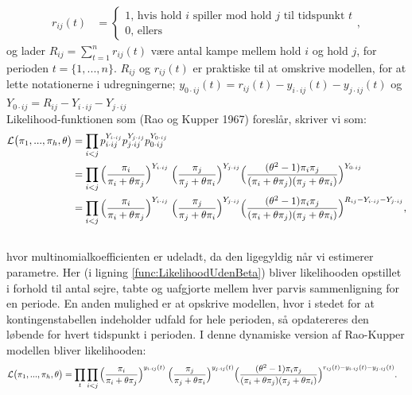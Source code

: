 \documentclass[11pt,a4paper]{article}
\begin{document}
\begin{align*}
r_{ij}(t)&=\begin{cases}
1\text{, hvis hold $i$ spiller mod hold $j$ til tidspunkt $t$}\\
0\text{, ellers}
\end{cases},
\end{align*}
og lader $R_{ij}=\sum_{t=1}^nr_{ij}(t)$ være antal kampe mellem hold $i$ og hold $j$, for perioden $t=\{1,...,n\}$. $R_{ij}$ og $r_{ij}(t)$ er praktiske til at omskrive modellen, for at lette notationerne i udregningerne; $y_{0\cdot ij}(t)=r_{ij}(t)-y_{i\cdot ij}(t)-y_{j\cdot ij}(t)$ og $Y_{0\cdot ij}=R_{ij}-Y_{i\cdot ij}-Y_{j\cdot ij}$\\
Likelihood-funktionen som (Rao og Kupper 1967) \cite{RaoKupper} foreslår, skriver vi som:
\begin{align}
\mathcal{L}\big{(}\pi_1,...,\pi_h,\theta\big{)} &= \prod_{i<j}p_{i\cdot ij}^{Y_{i\cdot ij}}p_{j\cdot ij}^{Y_{j\cdot ij}}p_{0\cdot ij}^{Y_{0\cdot ij}}  \nonumber\\
&= \prod_{i<j}\Big{(}\frac{\pi_i}{\pi_i+\theta\pi_j}\Big{)}^{Y_{i\cdot ij}} \label{func:LikelihoodUdenBeta}
\;\Big{(}\frac{\pi_j}{\pi_j+\theta\pi_i}\Big{)}^{Y_{j\cdot ij}}
\Big{(}\frac{(\theta^2-1)\pi_i \pi_j}{(\pi_i+\theta\pi_j)(\pi_j+\theta\pi_i)}\Big{)}^{Y_{0\cdot ij}}\\
&=\prod_{i<j}\Big{(}\frac{\pi_i}{\pi_i+\theta\pi_j}\Big{)}^{Y_{i\cdot ij}}
\;\Big{(}\frac{\pi_j}{\pi_j+\theta\pi_i}\Big{)}^{Y_{j\cdot ij}}
\Big{(}\frac{(\theta^2-1)\pi_i  \pi_j}{(\pi_i+\theta\pi_j)(\pi_j+\theta\pi_i)}\Big{)}^{R_{ij}-{Y_{i\cdot ij}}-{Y_{j\cdot ij}}},\nonumber\\ \nonumber
\end{align}
hvor multinomialkoefficienten er udeladt, da den ligegyldig når vi estimerer parametre. Her (i ligning \ref{func:LikelihoodUdenBeta}) bliver likelihooden opstillet i forhold til antal sejre, tabte og uafgjorte mellem hver parvis sammenligning for en periode. En anden mulighed er at opskrive modellen, hvor i stedet for at kontingenstabellen indeholder udfald for hele perioden, så opdatereres den løbende for hvert tidspunkt i perioden. I denne dynamiske version af Rao-Kupper modellen bliver likelihooden:
\begin{align*}
\mathcal{L}\big{(}\pi_1,...,\pi_h,\theta\big{)}
&=\prod_t\prod_{i<j}\Big{(}\frac{\pi_i}{\pi_i+\theta\pi_j}\Big{)}^{y_{i\cdot ij}(t)}
\;\Big{(}\frac{\pi_j}{\pi_j+\theta\pi_i}\Big{)}^{y_{j\cdot ij}(t)}
\Big{(}\frac{(\theta^2-1)\pi_i \pi_j}{(\pi_i+\theta\pi_j)(\pi_j+\theta\pi_i)}\Big{)}^{r_{ij}(t)-{y_{i\cdot ij}(t)}-{y_{j\cdot ij}(t)}}.
\end{align*}
\end{document}
